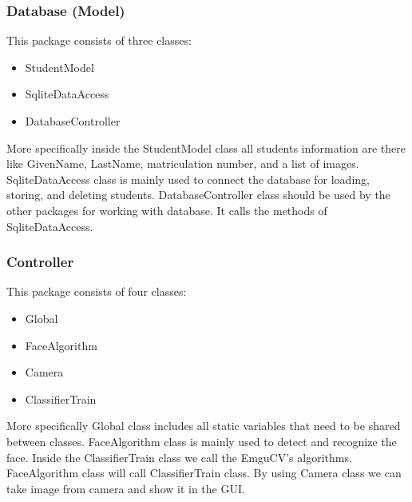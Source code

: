 \documentclass[12pt, a4paper]{article}
\begin{document}
\subsubsection{Database (Model)}
This package consists of three classes:
\begin{itemize}
\item StudentModel
\item SqliteDataAccess
\item DatabaseController
\end{itemize}

More specifically inside the StudentModel class all students information are there like GivenName, LastName, matriculation number, and a list of images.
SqliteDataAccess class  is mainly used to connect the database for loading, storing,  and deleting students.
DatabaseController class should be used by the other packages for working with database. It calls the methods of SqliteDataAccess.
\subsubsection{Controller}
This package consists of four classes:
\begin{itemize}
\item Global
\item FaceAlgorithm
\item Camera
\item ClassifierTrain
\end{itemize}
More specifically Global class includes all static variables that need to be shared between classes.
FaceAlgorithm  class is mainly used to detect and recognize the face.
Inside the ClassifierTrain class we call the EmguCV’s algorithms. FaceAlgorithm class will call ClassifierTrain class.
By using Camera class we can take image from camera and show it in the GUI. 
\end{document}
